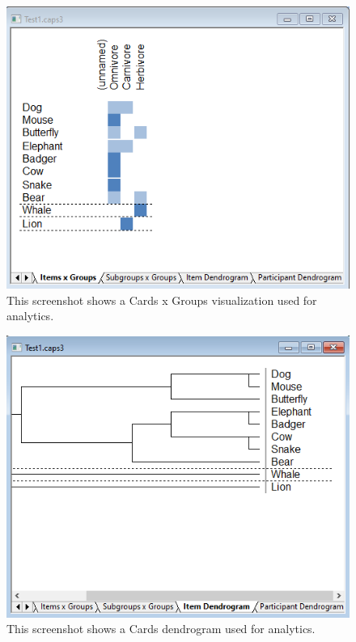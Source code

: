 \begin{figure}[tp] 
\centering
\includegraphics[keepaspectratio,width=\linewidth,height=\halfh]{images/syncaps-diagram-1.png}
\caption[SynCaps Clustering] { This screenshot shows a Cards x Groups
visualization used for analytics.
 }
\label{fig:SynCaps2}
\end{figure}

\begin{figure}[tp] 
\centering
\includegraphics[keepaspectratio,width=\linewidth,height=\halfh]{images/syncaps-diagram-2.png}
\caption[SynCaps Dendrogram] { This screenshot shows a Cards 
dendrogram used for analytics.
 }
\label{fig:SynCaps3}
\end{figure}

